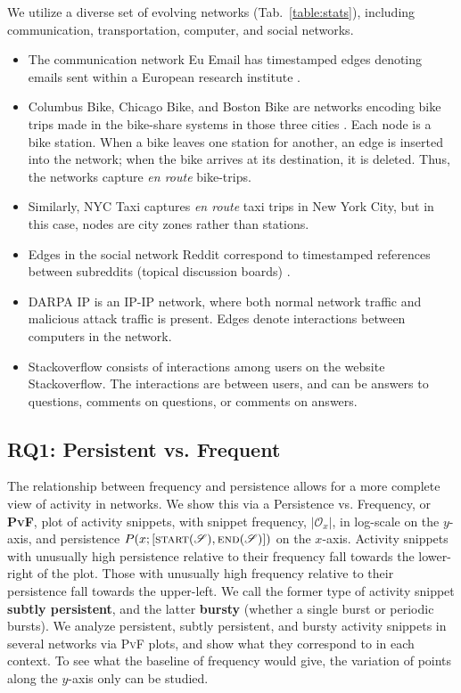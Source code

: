 \documentclass[sigconf]{acmart}
\newcommand{\xaxis}{$x$-axis\xspace}
\newcommand{\yaxis}{$y$-axis\xspace}
\newcommand{\pf}{\textsc{PvF}\xspace}
\newcommand{\stream}{\mathscr{S}}
\newcommand{\streamStart}{\textsc{start}(\stream)}
\newcommand{\streamEnd}{\textsc{end}(\stream)}
\newcommand{\pattern}{x}
\newcommand{\occs}{\mathcal{O}}
\newcommand{\persistence}{P}
\newcommand{\rOne}{\textbf{RQ1}}
\newcommand{\euemail}{Eu Email\xspace}
\newcommand{\columbus}{Columbus Bike\xspace}
\newcommand{\chicago}{Chicago Bike\xspace}
\newcommand{\boston}{Boston Bike\xspace}
\newcommand{\stackoverflow}{Stackoverflow\xspace}
\newcommand{\darpa}{DARPA IP\xspace}
\newcommand{\NYC}{NYC Taxi\xspace}
\newcommand{\reddit}{Reddit\xspace}
\begin{document}
We utilize a diverse set of evolving networks (Tab.~\ref{table:stats}), including communication, transportation, computer, and social networks. 
\begin{itemize}[leftmargin=*]
    \item The communication network \euemail has timestamped edges denoting emails sent within a European research institute \cite{snapnets}. 
    \item \columbus, \chicago, and \boston are networks encoding bike trips made in the bike-share systems in those three cities \cite{bikedatasets}. Each node is a bike station. When a bike leaves one station for another, an edge is inserted into the network; when the bike arrives at its destination, it is deleted. Thus, the networks capture \emph{en route} bike-trips.
    \item Similarly, \NYC \cite{taxidataset} captures \emph{en route} taxi trips in New York City, but in this case, nodes are city zones rather than stations.
    \item Edges in the social network \reddit correspond to timestamped references between subreddits (topical discussion boards) \cite{snapnets}. 
    \item \darpa \cite{lippmann1999results} is an IP-IP network, where both normal network traffic and malicious attack traffic is present. Edges denote interactions between computers in the network.
    \item \stackoverflow \cite{snapnets} consists of interactions among users on the website Stackoverflow. The interactions are between users, and can be answers to questions, comments on questions, or comments on answers.
\end{itemize}




\subsection{\rOne{}: Persistent vs. Frequent}
\label{subsec:p_vs_f}

{The relationship between frequency and persistence allows for a more complete view of activity in networks.}
We show this via a Persistence vs. Frequency, or \textbf{\pf}, plot of activity snippets, with snippet frequency, $|\occs_\pattern|$, in log-scale on the \yaxis, and persistence $\persistence(\pattern;[\streamStart,\streamEnd])$ on the \xaxis. 
Activity snippets with unusually high persistence relative to their frequency fall towards the lower-right of the plot. Those with unusually high frequency relative to their persistence fall towards the upper-left. We call the former type of activity snippet \textbf{subtly persistent}, and the latter \textbf{bursty} (whether a single burst or periodic bursts). We analyze persistent, subtly persistent, and bursty activity snippets in several 
networks via \pf plots, and show what they correspond to in each context.
{To see what the baseline of frequency would give, the variation of points along the \yaxis only can be studied.}
\end{document}
